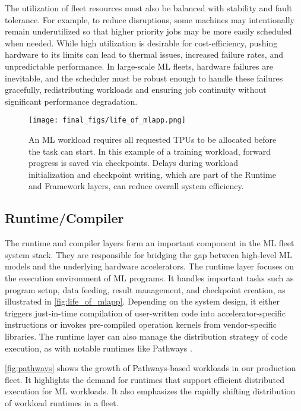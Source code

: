 The utilization of fleet resources must also be balanced with stability and fault tolerance. For example, to reduce disruptions, some machines may intentionally remain underutilized so that higher priority jobs may be more easily scheduled when needed. While high utilization is desirable for cost-efficiency, pushing hardware to its limits can lead to thermal issues, increased failure rates, and unpredictable performance. In large-scale ML fleets, hardware failures are inevitable, and the scheduler must be robust enough to handle these failures gracefully, redistributing workloads and ensuring job continuity without significant performance degradation.






\begin{figure}[t!]
    \centering
    \texttt{[image: final\_figs/life\_of\_mlapp.png]}
    \caption{An ML workload requires all requested TPUs to be allocated before the task can start. In this example of a training workload, forward progress is saved via checkpoints. Delays during workload initialization and checkpoint writing, which are part of the Runtime and Framework layers, can reduce overall system efficiency.}
    \label{fig:life_of_mlapp}
\end{figure}

\subsection{Runtime/Compiler}

The runtime and compiler layers form an important component in the ML fleet system stack. They are responsible for bridging the gap between high-level ML models and the underlying hardware accelerators. The runtime layer focuses on the execution environment of ML programs. It handles important tasks such as program setup, data feeding, result management, and checkpoint creation, as illustrated in \autoref{fig:life_of_mlapp}. Depending on the system design, it either triggers just-in-time compilation of user-written code into accelerator-specific instructions or invokes pre-compiled operation kernels from vendor-specific libraries. The runtime layer can also manage the distribution strategy of code execution, as with notable runtimes like Pathways \cite{barham2022pathways}.

\autoref{fig:pathways} shows the growth of Pathways-based workloads in our production fleet. It highlights the demand for runtimes that support efficient distributed execution for ML workloads. It also emphasizes the rapidly shifting distribution of workload runtimes in a fleet.




